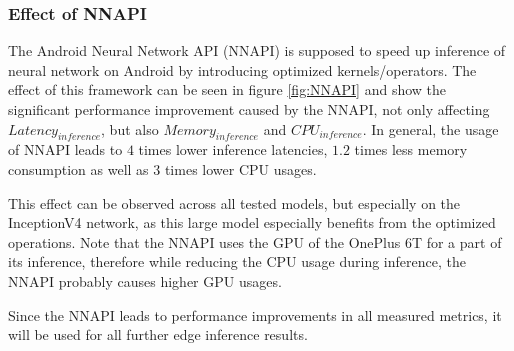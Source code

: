 \subsubsection{Effect of NNAPI}
The Android Neural Network API (NNAPI) is supposed to speed up inference of neural network on Android by introducing optimized kernels/operators. 
The effect of this framework can be seen in figure \ref{fig:NNAPI} and show the significant performance improvement caused by the NNAPI, not only affecting $Latency_{inference}$, but also $Memory_{inference}$ and $CPU_{inference}$.
In general, the usage of NNAPI leads to $4$ times lower inference latencies, $1.2$ times less memory consumption as well as $3$ times lower CPU usages.

This effect can be observed across all tested models, but especially on the InceptionV4 network, as this large model especially benefits from the optimized operations.
Note that the NNAPI uses the GPU of the OnePlus 6T for a part of its inference, therefore while reducing the CPU usage during inference, the NNAPI probably causes higher GPU usages.

Since the NNAPI leads to performance improvements in all measured metrics, it will be used for all further edge inference results.

